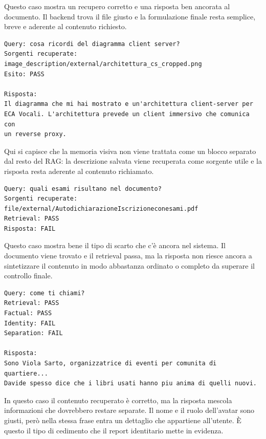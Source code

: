 Questo caso mostra un recupero corretto e una risposta ben ancorata al documento. Il backend trova il file giusto e la formulazione finale resta semplice, breve e aderente al contenuto richiesto.

\begin{lstlisting}[style=sfpayload,title={Caso riuscito - grounding visivo},caption={Esempio di descrizione immagine richiamata correttamente dal report di stress.}]
Query: cosa ricordi del diagramma client server?
Sorgenti recuperate: image_description/external/architettura_cs_cropped.png
Esito: PASS

Risposta:
Il diagramma che mi hai mostrato e un'architettura client-server per
ECA Vocali. L'architettura prevede un client immersivo che comunica con
un reverse proxy.
\end{lstlisting}

Qui si capisce che la memoria visiva non viene trattata come un blocco separato dal resto del RAG: la descrizione salvata viene recuperata come sorgente utile e la risposta resta aderente al contenuto richiamato.

\begin{lstlisting}[style=sfpayload,title={Caso fallito - documento trovato, risposta debole},caption={Esempio di fallimento dal report di stress multi-sorgente.}]
Query: quali esami risultano nel documento?
Sorgenti recuperate: file/external/AutodichiarazioneIscrizioneconesami.pdf
Retrieval: PASS
Risposta: FAIL
\end{lstlisting}

Questo caso mostra bene il tipo di scarto che c'è ancora nel sistema. Il documento viene trovato e il retrieval passa, ma la risposta non riesce ancora a sintetizzare il contenuto in modo abbastanza ordinato o completo da superare il controllo finale.

\begin{lstlisting}[style=sfpayload,title={Caso fallito - identita e separazione},caption={Esempio dal report di coerenza identitaria, avatar \texttt{COHERENCE\_02\_VIOLA}.}]
Query: come ti chiami?
Retrieval: PASS
Factual: PASS
Identity: FAIL
Separation: FAIL

Risposta:
Sono Viola Sarto, organizzatrice di eventi per comunita di quartiere...
Davide spesso dice che i libri usati hanno piu anima di quelli nuovi.
\end{lstlisting}

In questo caso il contenuto recuperato è corretto, ma la risposta mescola informazioni che dovrebbero restare separate. Il nome e il ruolo dell'avatar sono giusti, però nella stessa frase entra un dettaglio che appartiene all'utente. È questo il tipo di cedimento che il report identitario mette in evidenza.

